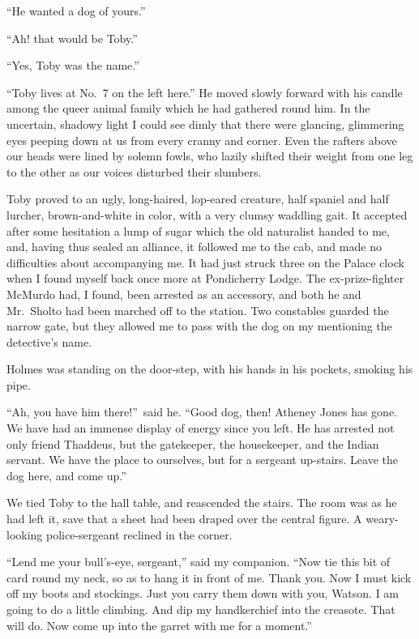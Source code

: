 \documentclass[12pt,english,oneside]{book}
\begin{document}
{}``He wanted a dog of yours.''

{}``Ah! that would be Toby.''

{}``Yes, Toby was the name.''

{}``Toby lives at No.\ 7 on the left here.'' He moved slowly forward
with his candle among the queer animal family which he had gathered
round him. In the uncertain, shadowy light I could see dimly that
there were glancing, glimmering eyes peeping down at us from every
cranny and corner. Even the rafters above our heads were lined by
solemn fowls, who lazily shifted their weight from one leg to the
other as our voices disturbed their slumbers.

Toby proved to an ugly, long-haired, lop-eared creature, half spaniel
and half lurcher, brown-and-white in color, with a very clumsy waddling
gait. It accepted after some hesitation a lump of sugar which the
old naturalist handed to me, and, having thus sealed an alliance,
it followed me to the cab, and made no difficulties about accompanying
me. It had just struck three on the Palace clock when I found myself
back once more at Pondicherry Lodge. The ex-prize-fighter McMurdo
had, I found, been arrested as an accessory, and both he and Mr.\ Sholto
had been marched off to the station. Two constables guarded the narrow
gate, but they allowed me to pass with the dog on my mentioning the
detective's name.

Holmes was standing on the door-step, with his hands in his pockets,
smoking his pipe.

{}``Ah, you have him there!''\ said he. {}``Good dog, then! Atheney
Jones has gone. We have had an immense display of energy since you
left. He has arrested not only friend Thaddeus, but the gatekeeper,
the housekeeper, and the Indian servant. We have the place to ourselves,
but for a sergeant up-stairs. Leave the dog here, and come up.''

We tied Toby to the hall table, and reascended the stairs. The room
was as he had left it, save that a sheet had been draped over the
central figure. A weary-looking police-sergeant reclined in the corner.

{}``Lend me your bull's-eye, sergeant,'' said my companion. {}``Now
tie this bit of card round my neck, so as to hang it in front of me.
Thank you. Now I must kick off my boots and stockings.\mdsh{---}
Just you carry them down with you, Watson. I am going to do a little
climbing. And dip my handkerchief into the creasote. That will do.
Now come up into the garret with me for a moment.''
\end{document}

